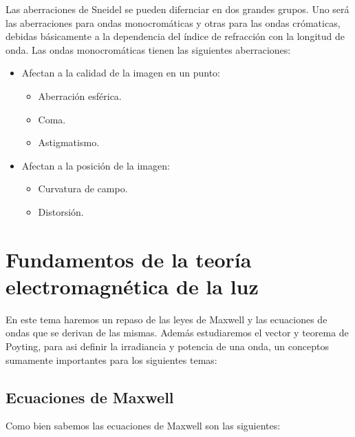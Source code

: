 \documentclass[12pt]{article}
\numberwithin{equation}{section}
\numberwithin{figure}{section}
\begin{document}
Las aberraciones de Sneidel se pueden difernciar en dos grandes grupos. Uno será las aberraciones para ondas monocromáticas y otras para las ondas crómaticas, debidas básicamente a la dependencia del índice de refracción con la longitud de onda. Las ondas monocromáticas tienen las siguientes aberraciones:

\begin{itemize}
\item Afectan a la calidad de la imagen en un punto:
\begin{itemize}
\item Aberración esférica.
\item Coma.
\item Astigmatismo.
\end{itemize}
\item Afectan a la posición de la imagen:
\begin{itemize}
\item Curvatura de campo.
\item Distorsión.
\end{itemize}
\end{itemize}

\newpage

\section{Fundamentos de la teoría electromagnética de la luz}

En este tema haremos un repaso de las leyes de Maxwell y las ecuaciones de ondas que se derivan de las mismas. Además estudiaremos el vector y teorema de Poyting, para asi definir la irradiancia y potencia de una onda, un conceptos sumamente importantes para los siguientes temas:

\subsection{Ecuaciones de Maxwell}

Como bien sabemos las ecuaciones de Maxwell son las siguientes:
\end{document}
